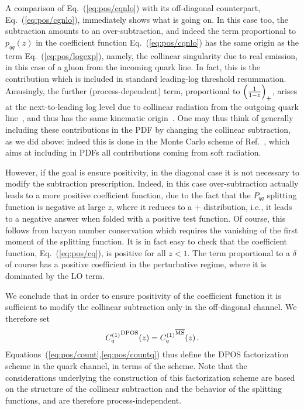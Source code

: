 A comparison of Eq.~(\ref{eq:pos/cqnlo}) with its off-diagonal counterpart,
Eq.~(\ref{eq:pos/cgnlo}), immediately shows what is going on. In this
case too, the \msbar{} subtraction amounts to an over-subtraction, and
indeed the term proportional to $p_{qq}(z)$ in the coefficient
function Eq.~(\ref{eq:pos/cqnlo}) has the same origin as the term
Eq.~(\ref{eq:pos/logexp}), namely, the collinear singularity due to real
emission, in this case of a gluon from the incoming quark line. In
fact,  this is the contribution which is included in standard
leading-log threshold resummation. Amusingly, the further
(process-dependent)
term, proportional
to ${ \left( \frac{1}{1-z} \right)_+ }$, arises at the next-to-leading log level due to collinear
radiation from the outgoing quark line~\cite{Catani:1989ne}, and thus has
the same kinematic origin~\cite{Forte:2002ni}.
One may thus think of generally including these contributions in the
PDF by changing the collinear subtraction, as we did above: indeed
this is done in the Monte Carlo scheme of
Ref.~\cite{Jadach:2016acv}, which aims at including in PDFs
all contributions coming from soft radiation.


However, if the goal is ensure positivity, in the diagonal case
it is not necessary to
modify the \msbar{}  subtraction prescription. Indeed,
in this case over-subtraction actually leads to a more positive
coefficient function, due to the fact that the $P_{qq}$ splitting
function  is negative at large $z$, where it reduces to a $+$
distribution,
i.e., it leads to a negative answer
when folded with a positive test function. Of course, this follows from
baryon number conservation which requires the vanishing of the first
moment of the splitting function. It is in fact easy to check that the
\msbar{} coefficient function, Eq.~(\ref{eq:pos/cq}), is positive for all
$z<1$. The  term proportional to a $\delta$ of course has a positive
coefficient in the perturbative regime, where it is dominated by the
LO term.

We conclude that in order to ensure positivity of the coefficient
function it is sufficient to modify the collinear subtraction only in the
off-diagonal channel. We therefore set
\begin{align}\label{eq:pos/countq}
   {C_{q}^{(1)}}^{\textrm{DPOS}}(z)=  {C_{q}^{(1)}}^{{\overline{\textrm{MS}}}}(z) \,.
\end{align}
Equations~(\ref{eq:pos/count},\ref{eq:pos/countq}) thus define the DPOS
factorization scheme in the quark channel, in terms of the \msbar{} scheme.
Note that the considerations underlying the construction of this
factorization scheme are based on the
structure of the collinear subtraction and the behavior of the
splitting functions, and are therefore process-independent.

